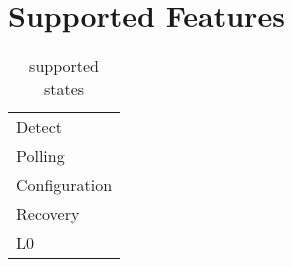 \section{Supported Features}
\begin{table}[H]
    \caption{supported states}
    \centering
  \begin{tabular}{ |m{26mm}|}
\hline
\rowcolor{Gray}
\multicolumn{1}{|c|}{\textbf{
Supported States
} } \\
\hline

Detect \\ \hline 
Polling \\ \hline
Configuration\\ \hline
Recovery\\ \hline
L0\\ \hline 

\end{tabular}

\end{table}





